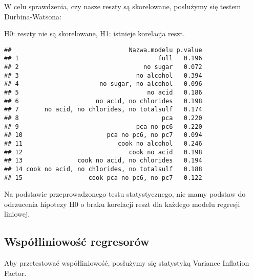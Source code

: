 \documentclass[
]{article}
\newenvironment{Shaded}{\begin{snugshade}}{\end{snugshade}}
\newcommand{\ControlFlowTok}[1]{\textcolor[rgb]{0.13,0.29,0.53}{\textbf{#1}}}
\newcommand{\DecValTok}[1]{\textcolor[rgb]{0.00,0.00,0.81}{#1}}
\newcommand{\FunctionTok}[1]{\textcolor[rgb]{0.13,0.29,0.53}{\textbf{#1}}}
\newcommand{\NormalTok}[1]{#1}
\newcommand{\OtherTok}[1]{\textcolor[rgb]{0.56,0.35,0.01}{#1}}
\newcommand{\SpecialCharTok}[1]{\textcolor[rgb]{0.81,0.36,0.00}{\textbf{#1}}}
\newcommand{\StringTok}[1]{\textcolor[rgb]{0.31,0.60,0.02}{#1}}
\begin{document}
W celu sprawdzenia, czy nasze reszty są skorelowane, posłużymy się
testem Durbina-Watsona:

H0: reszty nie są skorelowane, H1: istnieje korelacja reszt.

\begin{Shaded}
\end{Shaded}

\begin{verbatim}
##                                Nazwa.modelu p.value
## 1                                      full   0.196
## 2                                  no sugar   0.072
## 3                                no alcohol   0.394
## 4                      no sugar, no alcohol   0.096
## 5                                   no acid   0.186
## 6                     no acid, no chlorides   0.198
## 7       no acid, no chlorides, no totalsulf   0.174
## 8                                       pca   0.220
## 9                                pca no pc6   0.220
## 10                       pca no pc6, no pc7   0.094
## 11                          cook no alcohol   0.246
## 12                             cook no acid   0.198
## 13               cook no acid, no chlorides   0.194
## 14 cook no acid, no chlorides, no totalsulf   0.188
## 15                  cook pca no pc6, no pc7   0.122
\end{verbatim}

Na podstawie przeprowadzonego testu statystycznego, nie mamy podstaw do
odrzucenia hipotezy H0 o braku korelacji reszt dla każdego modelu
regresji liniowej.

\subsection{Współliniowość
regresorów}\label{wspuxf3ux142liniowoux15bux107-regresoruxf3w}

Aby przetestować współliniowość, posłużymy się statystyką Variance
Inflation Factor.
\end{document}
